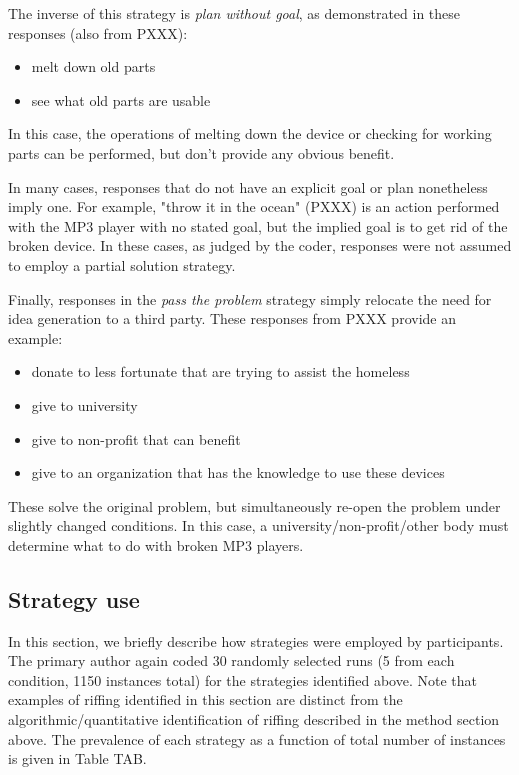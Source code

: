 The inverse of this strategy is \emph{plan without goal}, as demonstrated in these responses (also from PXXX):

\begin{itemize}
    \item melt down old parts
    \item see what old parts are usable
\end{itemize}

In this case, the operations of melting down the device or checking for working parts can be performed, but don't provide any obvious benefit.

In many cases, responses that do not have an explicit goal or plan nonetheless imply one. For example, "throw it in the ocean" (PXXX) is an action performed with the MP3 player with no stated goal, but the implied goal is to get rid of the broken device. In these cases, as judged by the coder, responses were not assumed to employ a partial solution strategy.

Finally, responses in the \emph{pass the problem} strategy simply relocate the need for idea generation to a third party. These responses from PXXX provide an example:

\begin{itemize}
    \item donate to less fortunate that are trying to assist the homeless
    \item give to university
    \item give to non-profit that can benefit
    \item give to an organization that has the knowledge to use these devices
\end{itemize}

These solve the original problem, but simultaneously re-open the problem under slightly changed conditions. In this case, a university/non-profit/other body must determine what to do with broken MP3 players.

\subsection{Strategy use}

In this section, we briefly describe how strategies were employed by participants. The primary author again coded 30 randomly selected runs (5 from each condition, 1150 instances total) for the strategies identified above. Note that examples of riffing identified in this section are distinct from the algorithmic/quantitative identification of riffing described in the method section above. The prevalence of each strategy as a function of total number of instances is given in Table TAB.

